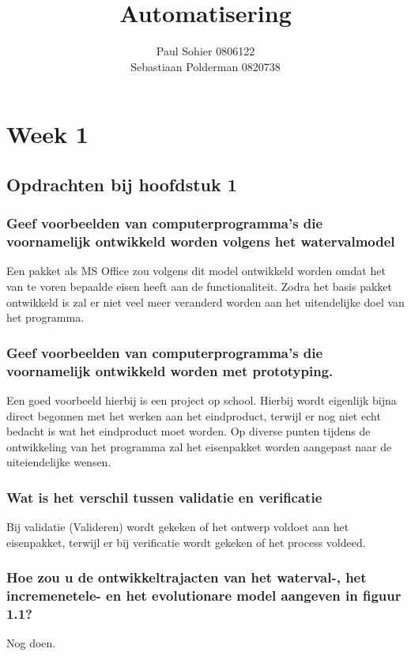 \documentclass[a4paper,titlepage]{artikel1}
\author{Paul Sohier 0806122\\Sebastiaan Polderman 0820738}
\title{Automatisering}
\begin{document}
\maketitle
\tableofcontents
\newpage
\section{Week 1}
\subsection{Opdrachten bij hoofdstuk 1}
\subsubsection[Opdracht 1]{Geef voorbeelden van computerprogramma's die voornamelijk ontwikkeld worden volgens het watervalmodel}
Een pakket als MS Office zou volgens dit model ontwikkeld worden omdat het van te voren bepaalde eisen heeft aan de functionaliteit. 
Zodra het basis pakket ontwikkeld is zal er niet veel meer veranderd worden aan het uitendelijke doel van het programma.

\subsubsection[Opdracht 2]{Geef voorbeelden van computerprogramma's die voornamelijk ontwikkeld worden met prototyping.}
Een goed voorbeeld hierbij is een project op school. Hierbij wordt eigenlijk bijna direct begonnen met het werken aan het eindproduct, terwijl er nog niet echt bedacht is wat het eindproduct moet worden. Op diverse punten tijdens de ontwikkeling van het programma zal het eisenpakket worden aangepast naar de uiteiendelijke wensen.

\subsubsection[Opdracht 3]{Wat is het verschil tussen validatie en verificatie}
Bij validatie (Valideren) wordt gekeken of het ontwerp voldoet aan het eisenpakket, terwijl er bij verificatie wordt gekeken of het process voldeed.

\subsubsection[Opdracht 4]{Hoe zou u de ontwikkeltrajacten van het waterval-, het incremenetele- en het evolutionare model aangeven in figuur 1.1?}
Nog doen.
\end{document}
